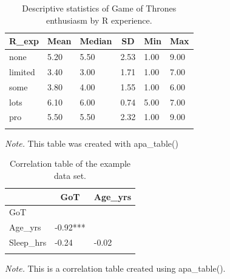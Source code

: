\documentclass[english,man]{apa6}
\theoremstyle{definition}
\theoremstyle{definition}
\theoremstyle{remark}
\begin{document}
\begin{table}[tbp]
\begin{center}
\begin{threeparttable}
\caption{\label{tab:GoT-by-experience}Descriptive statistics of Game of Thrones enthusiasm by R experience.}
\begin{tabular}{llllll}
\toprule
R\_exp & \multicolumn{1}{c}{Mean} & \multicolumn{1}{c}{Median} & \multicolumn{1}{c}{SD} & \multicolumn{1}{c}{Min} & \multicolumn{1}{c}{Max}\\
\midrule
none & 5.20 & 5.50 & 2.53 & 1.00 & 9.00\\
limited & 3.40 & 3.00 & 1.71 & 1.00 & 7.00\\
some & 3.80 & 4.00 & 1.55 & 1.00 & 6.00\\
lots & 6.10 & 6.00 & 0.74 & 5.00 & 7.00\\
pro & 5.50 & 5.50 & 2.32 & 1.00 & 9.00\\
\bottomrule
\addlinespace
\end{tabular}
\begin{tablenotes}[para]
\textit{Note.} This table was created with apa\_table()
\end{tablenotes}
\end{threeparttable}
\end{center}
\end{table}

\begin{table}[tbp]
\begin{center}
\begin{threeparttable}
\caption{\label{tab:apa-corr-table}Correlation table of the example data set.}
\begin{tabular}{lll}
\toprule
 & \multicolumn{1}{c}{GoT} & \multicolumn{1}{c}{Age\_yrs}\\
\midrule
GoT &  & \\
Age\_yrs & -0.92*** & \\
Sleep\_hrs & -0.24 & -0.02\\
\bottomrule
\addlinespace
\end{tabular}
\begin{tablenotes}[para]
\textit{Note.} This is a correlation table created using apa\_table().
\end{tablenotes}
\end{threeparttable}
\end{center}
\end{table}
\end{document}
